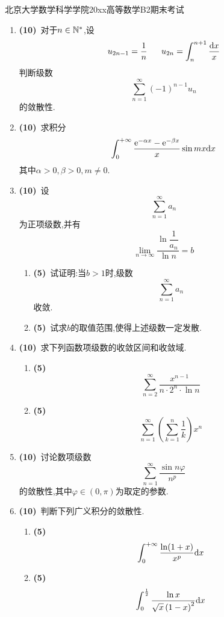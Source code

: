\documentclass{ctexart}
\begin{document}
\pagestyle{empty}
\begin{center}\Large
    北京大学数学科学学院20xx高等数学B2期末考试
\end{center}
\begin{enumerate}[leftmargin=*,label=\textbf{\arabic*.},topsep=0pt,parsep=0pt,itemsep=0pt,partopsep=0pt]
    \item \textbf{(10)}\ 对于$n\in\mathbb{N}^*$,设
        \[u_{2n-1}=\dfrac1n\ \ \ \ \ u_{2n}=\int_n^{n+1}\dfrac{\di x}{x}\]
        判断级数
        \[\sum_{n=1}^{\infty}(-1)^{n-1}u_n\]
        的敛散性.

    \item \textbf{(10)}\ 求积分
        \[\int_0^{+\infty}\dfrac{\mathrm{e}^{-\alpha x}-\mathrm{e}^{-\beta x}}{x}\sin mx\mathrm{d} x\]
        其中$\alpha>0,\beta>0,m\neq0$.

    \item \textbf{(10)}\ 设
        \[\sum_{n=1}^{\infty}a_n\]
        为正项级数,并有
        \[\lim_{n\to\infty}\dfrac{\ln\dfrac{1}{a_n}}{\ln n}=b\]
        \begin{enumerate}[label=\tbf{(\arabic*)},topsep=0pt,parsep=0pt,itemsep=0pt,partopsep=0pt]
            \item \textbf{(5)}\ 试证明:当$b>1$时,级数
                \[\sum_{n=1}^{\infty}a_n\]
                收敛.
            \item \textbf{(5)}\ 试求$b$的取值范围,使得上述级数一定发散.
        \end{enumerate}

    \item \textbf{(10)}\ 求下列函数项级数的收敛区间和收敛域.
        \begin{enumerate}[label=\tbf{(\arabic*)},topsep=0pt,parsep=0pt,itemsep=0pt,partopsep=0pt]
            \item \textbf{(5)}\ 
                \[\sum_{n=2}^{\infty}\dfrac{x^{n-1}}{n\cdot2^n\cdot\ln n}\]
            \item \textbf{(5\songti{分})}\ 
                \[\sum_{n=1}^{\infty}\left(\sum_{k=1}^{n}\dfrac{1}{k}\right)x^n\]

        \end{enumerate}
        
    \item \textbf{(10)}\ 讨论数项级数
        \[\sum_{n=1}^{\infty}\dfrac{\sin n\varphi}{n^p}\]
        的敛散性,其中$\varphi\in(0,\pi)$为取定的参数.

    \item \textbf{(10)}\ 判断下列广义积分的敛散性.
        \begin{enumerate}[label=\tbf{(\arabic*)},topsep=0pt,parsep=0pt,itemsep=0pt,partopsep=0pt]
            \item \textbf{(5)}
                \[\int_0^{+\infty}\dfrac{\ln(1+x)}{x^p}\mathrm{d} x\]
            \item \textbf{(5\songti{分})}
                \[\int_0^{\frac12}\dfrac{\ln x}{\sqrt{x}\left(1-x\right)^2}\mathrm{d} x\]


\end{enumerate}
\end{enumerate}
\end{document}
